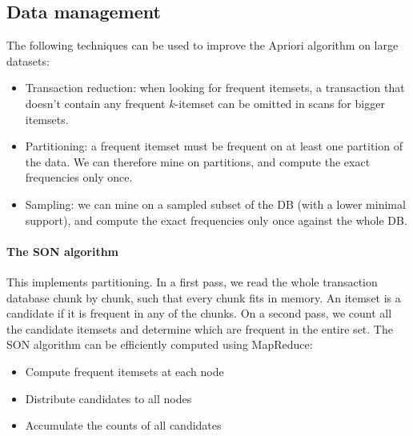 \subsection{Data management}
The following techniques can be used to improve the Apriori algorithm on large datasets:
\begin{itemize}
\item Transaction reduction: when looking for frequent itemsets, a transaction that doesn't contain any frequent $k$-itemset can be omitted in scans for bigger itemsets.
\item Partitioning: a frequent itemset must be frequent on at least one partition of the data. We can therefore mine on partitions, and compute the exact frequencies only once.
\item Sampling: we can mine on a sampled subset of the DB (with a lower minimal support), and compute the exact frequencies only once against the whole DB.
\end{itemize}

\paragraph{The SON algorithm}
This implements partitioning. In a first pass, we read the whole transaction database chunk by chunk, such that every chunk fits in memory. An itemset is a candidate if it is frequent in any of the chunks.
On a second pass, we count all the candidate itemsets and determine which are frequent in the entire set.
The SON algorithm can be efficiently computed using MapReduce:
\begin{itemize}
\item Compute frequent itemsets at each node
\item Distribute candidates to all nodes
\item Accumulate the counts of all candidates
\end{itemize}